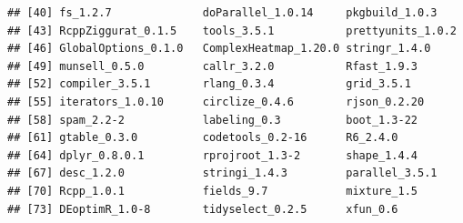 \documentclass{article}\usepackage[]{graphicx}\usepackage[]{color}
\makeatletter
\newenvironment{kframe}{%
 \def\at@end@of@kframe{}%
 \ifinner\ifhmode%
  \def\at@end@of@kframe{\end{minipage}}%
  \begin{minipage}{\columnwidth}%
 \fi\fi%
 \def\FrameCommand##1{\hskip\@totalleftmargin \hskip-\fboxsep
 \colorbox{shadecolor}{##1}\hskip-\fboxsep
     \hskip-\linewidth \hskip-\@totalleftmargin \hskip\columnwidth}%
 \MakeFramed {\advance\hsize-\width
   \@totalleftmargin\z@ \linewidth\hsize
   \@setminipage}}%
 {\par\unskip\endMakeFramed%
 \at@end@of@kframe}
\newenvironment{knitrout}{}{} %
\makeatother
\begin{document}
\begin{knitrout}
\begin{kframe}
\begin{verbatim}
## [40] fs_1.2.7              doParallel_1.0.14     pkgbuild_1.0.3       
## [43] RcppZiggurat_0.1.5    tools_3.5.1           prettyunits_1.0.2    
## [46] GlobalOptions_0.1.0   ComplexHeatmap_1.20.0 stringr_1.4.0        
## [49] munsell_0.5.0         callr_3.2.0           Rfast_1.9.3          
## [52] compiler_3.5.1        rlang_0.3.4           grid_3.5.1           
## [55] iterators_1.0.10      circlize_0.4.6        rjson_0.2.20         
## [58] spam_2.2-2            labeling_0.3          boot_1.3-22          
## [61] gtable_0.3.0          codetools_0.2-16      R6_2.4.0             
## [64] dplyr_0.8.0.1         rprojroot_1.3-2       shape_1.4.4          
## [67] desc_1.2.0            stringi_1.4.3         parallel_3.5.1       
## [70] Rcpp_1.0.1            fields_9.7            mixture_1.5          
## [73] DEoptimR_1.0-8        tidyselect_0.2.5      xfun_0.6
\end{verbatim}
\end{kframe}
\end{knitrout}
\end{document}
